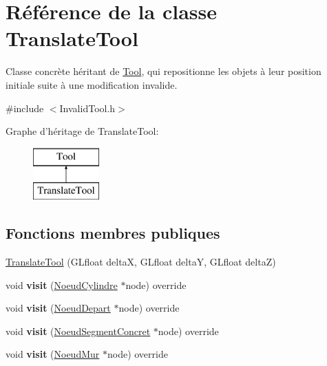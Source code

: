 \hypertarget{class_translate_tool}{\section{Référence de la classe Translate\-Tool}
\label{class_translate_tool}
}


Classe concrète héritant de \hyperlink{class_tool}{Tool}, qui repositionne les objets à leur position initiale suite à une modification invalide.  




{\ttfamily \#include $<$Invalid\-Tool.\-h$>$}

Graphe d'héritage de Translate\-Tool\-:\begin{figure}[H]
\begin{center}
\leavevmode
\includegraphics[height=2.000000cm]{class_translate_tool}
\end{center}
\end{figure}
\subsection*{Fonctions membres publiques}
\begin{DoxyCompactItemize}
\item 
\hyperlink{group__inf2990_ga48e1c155fef64a5a07991df870721ae6}{Translate\-Tool} (G\-Lfloat delta\-X, G\-Lfloat delta\-Y, G\-Lfloat delta\-Z)
\item 
\hypertarget{group__inf2990_ga64811cbd57db1cb725dc0d472c8f5ab1}{void {\bfseries visit} (\hyperlink{class_noeud_cylindre}{Noeud\-Cylindre} $\ast$node) override}\label{group__inf2990_ga64811cbd57db1cb725dc0d472c8f5ab1}

\item 
\hypertarget{group__inf2990_gab0781475ac48f2dcb8610bfee475aba3}{void {\bfseries visit} (\hyperlink{class_noeud_depart}{Noeud\-Depart} $\ast$node) override}\label{group__inf2990_gab0781475ac48f2dcb8610bfee475aba3}

\item 
\hypertarget{group__inf2990_ga3533e88b9fcc0f815cccb9e33773d756}{void {\bfseries visit} (\hyperlink{class_noeud_segment_concret}{Noeud\-Segment\-Concret} $\ast$node) override}\label{group__inf2990_ga3533e88b9fcc0f815cccb9e33773d756}

\item 
\hypertarget{group__inf2990_ga7172d03575c6b5062c61753f8d0bce08}{void {\bfseries visit} (\hyperlink{class_noeud_mur}{Noeud\-Mur} $\ast$node) override}\label{group__inf2990_ga7172d03575c6b5062c61753f8d0bce08}

\end{DoxyCompactItemize}
